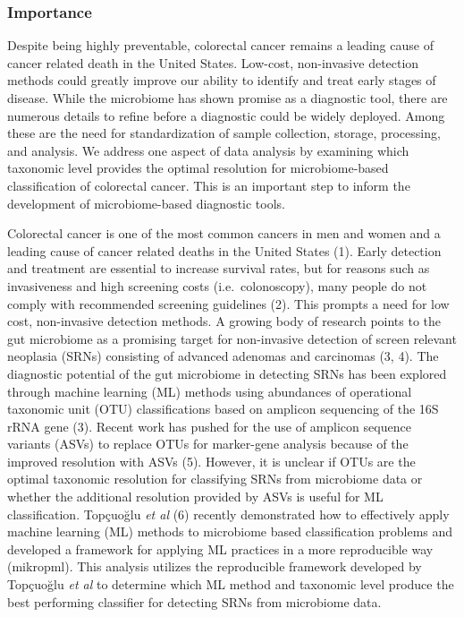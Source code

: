 \documentclass[]{article}
\begin{document}
\subsubsection{Importance}\label{importance}

Despite being highly preventable, colorectal cancer remains a leading
cause of cancer related death in the United States. Low-cost,
non-invasive detection methods could greatly improve our ability to
identify and treat early stages of disease. While the microbiome has
shown promise as a diagnostic tool, there are numerous details to refine
before a diagnostic could be widely deployed. Among these are the need
for standardization of sample collection, storage, processing, and
analysis. We address one aspect of data analysis by examining which
taxonomic level provides the optimal resolution for microbiome-based
classification of colorectal cancer. This is an important step to inform
the development of microbiome-based diagnostic tools.

\newpage

Colorectal cancer is one of the most common cancers in men and women and
a leading cause of cancer related deaths in the United States (1). Early
detection and treatment are essential to increase survival rates, but
for reasons such as invasiveness and high screening costs
(i.e.~colonoscopy), many people do not comply with recommended screening
guidelines (2). This prompts a need for low cost, non-invasive detection
methods. A growing body of research points to the gut microbiome as a
promising target for non-invasive detection of screen relevant neoplasia
(SRNs) consisting of advanced adenomas and carcinomas (3, 4). The
diagnostic potential of the gut microbiome in detecting SRNs has been
explored through machine learning (ML) methods using abundances of
operational taxonomic unit (OTU) classifications based on amplicon
sequencing of the 16S rRNA gene (3). Recent work has pushed for the use
of amplicon sequence variants (ASVs) to replace OTUs for marker-gene
analysis because of the improved resolution with ASVs (5). However, it
is unclear if OTUs are the optimal taxonomic resolution for classifying
SRNs from microbiome data or whether the additional resolution provided
by ASVs is useful for ML classification. Topçuoğlu \emph{et al} (6)
recently demonstrated how to effectively apply machine learning (ML)
methods to microbiome based classification problems and developed a
framework for applying ML practices in a more reproducible way
(mikropml). This analysis utilizes the reproducible framework developed
by Topçuoğlu \emph{et al} to determine which ML method and taxonomic
level produce the best performing classifier for detecting SRNs from
microbiome data.
\end{document}
